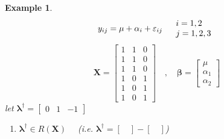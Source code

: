 \documentclass{article}
\newtheorem{example}[theorem]{Example}
\begin{document}
\begin{example}
\begin{equation*}
y_{ij}=\mu +\alpha _{i}+\varepsilon _{ij}\quad 
\begin{tabular}{l}
$i=1,2$ \\ 
$j=1,2,3$%
\end{tabular}%
\end{equation*}%
\begin{equation*}
\mathbf{X}=\left[ 
\begin{array}{ccc}
1 & 1 & 0 \\ 
1 & 1 & 0 \\ 
1 & 1 & 0 \\ 
1 & 0 & 1 \\ 
1 & 0 & 1 \\ 
1 & 0 & 1%
\end{array}%
\right] \quad ,\quad \mathbf{\beta }=\left[ 
\begin{array}{c}
\mu \\ 
\alpha _{1} \\ 
\alpha _{2}%
\end{array}%
\right]
\end{equation*}%
\newline
\newline
let $\mathbf{\lambda }^{\dagger }=\left[ 
\begin{array}{ccc}
0 & 1 & -1%
\end{array}%
\right] $

\begin{enumerate}
\item $\mathbf{\lambda }^{\dagger }\in R\left( \mathbf{X}\right) \quad $%
(i.e. $\mathbf{\lambda }^{\dagger }=\left[ \quad \right] -\left[ \quad %
\right] $)


\end{enumerate}
\end{example}
\end{document}
